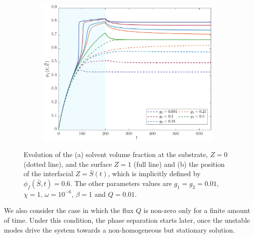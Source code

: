 \documentclass[12pt]{extarticle}
\begin{document}
\begin{figure}[h]
\begin{subfigure}{0.32\textwidth}
	\end{subfigure}
\hspace{2mm}
	\begin{subfigure}{0.32\textwidth}
		\hspace{-7mm}
	\includegraphics[scale=0.28]{images/transient_flux}
	\caption{}
	\end{subfigure}
	\caption{Evolution of the (a) solvent volume fraction at the substrate, $Z=0$ (dotted line), and the surface $Z=1$ (full line) and (b) the position of the interfacial $Z=\bar{S}(t)$, which is implicitly defined by $\phi_f(\bar{S},t)=0.6$. The other parameters values are $g_1=g_2=0.01$, $\chi=1$, $\omega=10^{-6}$, $\beta=1$ and $Q=0.01$.}
	\label{study}
\end{figure}

We also consider the case in which the flux $Q$ is non-zero only for a finite amount of time. Under this condition, the phase separation starts later, once the unstable modes drive the system towards a non-homogeneous but stationary solution. 
\end{document}
